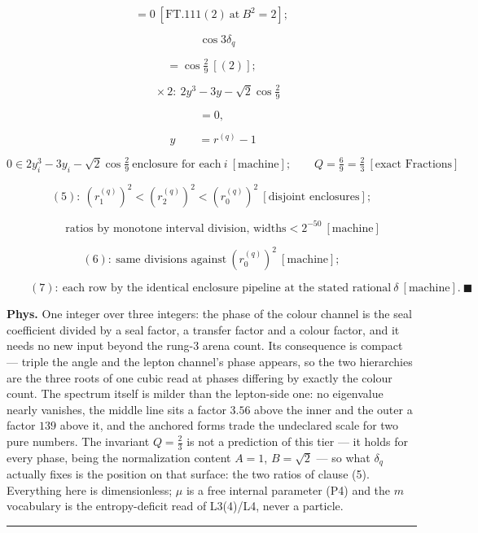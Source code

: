 \begin{theorem}[{\texorpdfstring{FT.119 — The triplet-attached mixing angle $\delta_q=2/27$ and its spectrum}{FT.119 - The triplet-attached mixing angle and its spectrum}}]
\[
= 0\ [\mathrm{FT.111}(2)\ \text{at}\ B^2=2];
\]

\[
\quad\cos3\delta_q
\]

\[
= \cos\tfrac29\ [(2)];
\]

\[
\quad\times2:\ 2y^3-3y-\sqrt2\cos\tfrac29
\]

\[
= 0,
\]

\[
\ y\qquad = r^{(q)}-1
\]

\[
0\in2y_i^3-3y_i-\sqrt2\cos\tfrac29\ \text{enclosure for each}\ i\ [\text{machine}];\qquad Q=\tfrac6{9}=\tfrac23\ [\text{exact Fractions}]
\]

\[
(5):\ (r^{(q)}_1)^2<(r^{(q)}_2)^2<(r^{(q)}_0)^2\ [\text{disjoint enclosures}];
\]

\[
\qquad \text{ratios by monotone interval division, widths}<2^{-50}\ [\text{machine}]
\]

\[
(6):\ \text{same divisions against}\ (r^{(q)}_0)^2\ [\text{machine}];
\]

\[
\qquad (7):\ \text{each row by the identical enclosure pipeline at the stated rational}\ \delta\ [\text{machine}].\ \blacksquare
\]

\textbf{Phys.} One integer over three integers: the phase of the colour channel is the seal coefficient divided by a seal factor, a transfer factor and a colour factor, and it needs no new input beyond the rung-3 arena count. Its consequence is compact — triple the angle and the lepton channel's phase appears, so the two hierarchies are the three roots of one cubic read at phases differing by exactly the colour count. The spectrum itself is milder than the lepton-side one: no eigenvalue nearly vanishes, the middle line sits a factor $3.56$ above the inner and the outer a factor $139$ above it, and the anchored forms trade the undeclared scale for two pure numbers. The invariant $Q=\tfrac23$ is not a prediction of this tier — it holds for every phase, being the normalization content $A=1$, $B=\sqrt2$ — so what $\delta_q$ actually fixes is the position on that surface: the two ratios of clause (5). Everything here is dimensionless; $\mu$ is a free internal parameter (P4) and the $m$ vocabulary is the entropy-deficit read of L3(4)/L4, never a particle.

\vspace{2pt}\noindent\rule{\textwidth}{0.4pt}\vspace{2pt}

\end{theorem}

